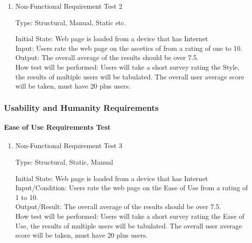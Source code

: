 \documentclass[12pt, titlepage]{article}
\begin{document}
\begin{enumerate}			
\item{Non-Functional Requirement Test 2\\}

Type: Structural, Manual, Static etc.
					
Initial State: Web page is loaded from a device that has Internet \\
					
Input:  Users rate the web page on the ascetics of from a rating of one to 10. \\
					
Output:  The overall average of the results should be over 7.5. \\
					
How test will be performed: Users will take a short survey rating the Style, the results of multiple users will be
tabulated. The overall user average score will be taken, must have 20 plus users. \\

\end{enumerate}


\subsubsection{Usability and Humanity Requirements}

\paragraph{Ease of Use Requirements Test}

\begin{enumerate}

\item{ Non-Functional Requirement Test 3\\}

Type: Structural, Static, Manual
					
Initial State: Web page is loaded from a device that has Internet \\
					
Input/Condition: Users rate the web page on the Ease of Use from a rating of 1 to 10. \\
					
Output/Result: The overall average of the results should be over 7.5. \\
					
How test will be performed: Users will take a short survey rating the Ease of Use, the results of multiple users will be
tabulated. The overall user average score will be taken, must have 20 plus users. \\

\end{enumerate}
\end{document}

